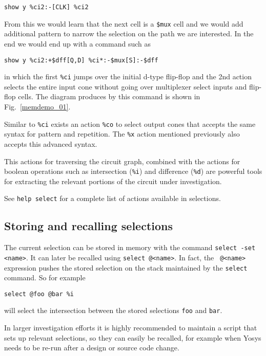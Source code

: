 \documentclass[9pt,technote,a4paper]{IEEEtran}
\begin{document}
\begin{verbatim}
show y %ci2:-[CLK] %ci2
\end{verbatim}

From this we would learn that the next cell is a {\tt \$mux} cell and we would add additional
pattern to narrow the selection on the path we are interested. In the end we would end up
with a command such as

\begin{verbatim}
show y %ci2:+$dff[Q,D] %ci*:-$mux[S]:-$dff
\end{verbatim}

in which the first {\tt \%ci} jumps over the initial d-type flip-flop and the
2nd action selects the entire input cone without going over multiplexer select
inputs and flip-flop cells. The diagram produces by this command is shown in
Fig.~\ref{memdemo_01}.

\medskip

Similar to {\tt \%ci} exists an action {\tt \%co} to select output cones that
accepts the same syntax for pattern and repetition. The {\tt \%x} action mentioned
previously also accepts this advanced syntax.

This actions for traversing the circuit graph, combined with the actions for
boolean operations such as intersection ({\tt \%i}) and difference ({\tt \%d})
are powerful tools for extracting the relevant portions of the circuit under
investigation.

See {\tt help select} for a complete list of actions available in selections.

\subsection{Storing and recalling selections}

The current selection can be stored in memory with the command {\tt select -set
<name>}. It can later be recalled using {\tt select @<name>}. In fact, the {\tt
@<name>} expression pushes the stored selection on the stack maintained by the
{\tt select} command. So for example

\begin{verbatim}
select @foo @bar %i
\end{verbatim}

will select the intersection between the stored selections {\tt foo} and {\tt bar}.

\medskip

In larger investigation efforts it is highly recommended to maintain a script that
sets up relevant selections, so they can easily be recalled, for example when
Yosys needs to be re-run after a design or source code change.
\end{document}
